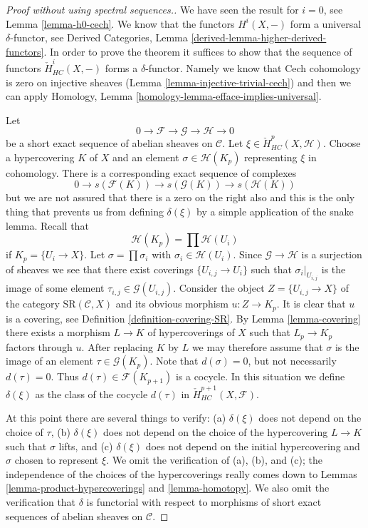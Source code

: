 \begin{proof}[Proof without using spectral sequences.]
We have seen the result for $i = 0$, see Lemma \ref{lemma-h0-cech}.
We know that the functors $H^i(X, -)$ form a universal $\delta$-functor, see
Derived Categories, Lemma \ref{derived-lemma-higher-derived-functors}.
In order to prove the theorem it suffices to show that
the sequence of functors $\check{H}^i_{HC}(X, -)$ forms a
$\delta$-functor. Namely we know that Cech cohomology
is zero on injective sheaves (Lemma \ref{lemma-injective-trivial-cech})
and then we can apply
Homology, Lemma \ref{homology-lemma-efface-implies-universal}.

\medskip\noindent
Let
$$
0 \to \mathcal{F} \to \mathcal{G} \to \mathcal{H} \to 0
$$
be a short exact sequence of abelian sheaves on $\mathcal{C}$.
Let $\xi \in \check{H}^p_{HC}(X, \mathcal{H})$. Choose a hypercovering
$K$ of $X$ and an element $\sigma \in \mathcal{H}(K_p)$ representing
$\xi$ in cohomology. There is a corresponding exact sequence of
complexes
$$
0 \to s(\mathcal{F}(K)) \to s(\mathcal{G}(K)) \to s(\mathcal{H}(K))
$$
but we are not assured that there is a zero on the right also and this
is the only thing that
prevents us from defining $\delta(\xi)$ by a simple application of the
snake lemma. Recall that
$$
\mathcal{H}(K_p) = \prod \mathcal{H}(U_i)
$$
if $K_p = \{U_i \to X\}$. Let $\sigma =\prod \sigma_i$ with
$\sigma_i \in \mathcal{H}(U_i)$. Since $\mathcal{G} \to \mathcal{H}$ is
a surjection of sheaves we see that there exist coverings
$\{U_{i, j} \to U_i\}$ such that $\sigma_i|_{U_{i, j}}$ is the
image of some element $\tau_{i, j} \in \mathcal{G}(U_{i, j})$.
Consider the object $Z = \{U_{i, j} \to X\}$ of the category
$\text{SR}(\mathcal{C}, X)$ and its obvious morphism
$u : Z \to K_p$. It is clear that $u$ is a covering, see
Definition \ref{definition-covering-SR}. By
Lemma \ref{lemma-covering} there
exists a morphism $L \to K$ of hypercoverings of $X$ such that
$L_p \to K_p$ factors through $u$. After replacing $K$ by $L$
we may therefore assume that $\sigma$ is the image of an
element $\tau \in \mathcal{G}(K_p)$. Note that $d(\sigma) = 0$,
but not necessarily $d(\tau) = 0$. Thus $d(\tau) \in \mathcal{F}(K_{p + 1})$
is a cocycle. In this situation we define
$\delta(\xi)$ as the class of the cocycle $d(\tau)$ in
$\check{H}^{p + 1}_{HC}(X, \mathcal{F})$.

\medskip\noindent
At this point there are several things to verify:
(a) $\delta(\xi)$ does not depend on the choice of $\tau$,
(b) $\delta(\xi)$ does not depend on the choice of the hypercovering
$L \to K$ such that $\sigma$ lifts, and
(c) $\delta(\xi)$ does not depend on the initial hypercovering and
$\sigma$ chosen to represent $\xi$. We omit the verification of
(a), (b), and (c); the independence of the choices of the hypercoverings
really comes down to Lemmas \ref{lemma-product-hypercoverings}
and \ref{lemma-homotopy}. We also omit the verification that
$\delta$ is functorial with respect to morphisms of short exact
sequences of abelian sheaves on $\mathcal{C}$.


\end{proof}
